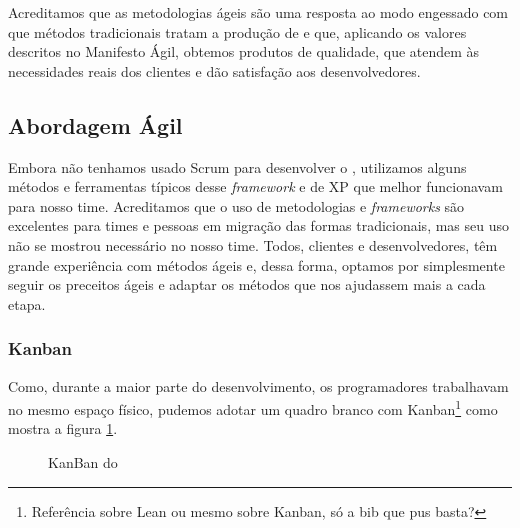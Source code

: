 Acreditamos que as metodologias ágeis são uma resposta ao modo engessado com que métodos tradicionais tratam a produção de \software{} e que, aplicando os valores descritos no Manifesto Ágil, obtemos produtos de qualidade, que atendem às necessidades reais dos clientes e dão satisfação aos desenvolvedores.  

\subsection{Abordagem Ágil}

Embora não tenhamos usado Scrum para desenvolver o \calopsita{}, utilizamos alguns métodos e ferramentas típicos desse \textit{framework} e de XP que melhor funcionavam para nosso time. Acreditamos que o uso de metodologias e \textit{frameworks} são excelentes para times e pessoas em migração das formas tradicionais, mas seu uso não se mostrou necessário no nosso time. Todos, clientes e desenvolvedores, têm grande experiência com métodos ágeis e, dessa forma, optamos por simplesmente seguir os preceitos ágeis e adaptar os métodos que nos ajudassem mais a cada etapa. 

\subsubsection*{Kanban~\cite{kanban}}

Como, durante a maior parte do desenvolvimento, os programadores trabalhavam no mesmo espaço físico, pudemos adotar um quadro branco com Kanban\footnote{Referência sobre Lean ou mesmo sobre Kanban, só a bib que pus basta?} como mostra a figura \ref{figura:kaban}.

\begin{figure}[H]
  \label{figura:kaban}
  \centering
  \caption{KanBan do \calopsita}
\end{figure}

